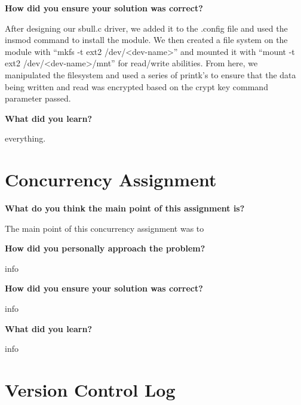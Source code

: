 \documentclass[10pt,letterpaper,draftclsnofoot,onecolumn]{IEEEtran}
\begin{document}
\medskip


\bigskip

\noindent\textbf{How did you ensure your solution was correct?}
\medskip

\medskip

\noindent After designing our sbull.c driver, we added it to the .config file and used the insmod command to install the module. We then created a file system on the module with ``mkfs -t ext2 /dev/\textless dev-name\textgreater'' and mounted it with ``mount -t ext2 /dev/\textless dev-name\textgreater /mnt'' for read/write abilities. From here, we manipulated the filesystem and used a series of printk's to ensure that the data being written and read was encrypted based on the crypt key command parameter passed.

\bigskip

\noindent\textbf{What did you learn?}
\medskip

\medskip

\noindent everything.

\section{Concurrency Assignment}
\bigskip

\noindent\textbf{What do you think the main point of this assignment is?}
\medskip

\medskip

\noindent The main point of this concurrency assignment was to 

\bigskip

\noindent\textbf{How did you personally approach the problem?}
\medskip

\medskip

\noindent info

\bigskip

\noindent\textbf{How did you ensure your solution was correct?}
\medskip

\medskip

\noindent info
\bigskip

\noindent\textbf{What did you learn?}
\medskip

\medskip

\noindent info
\medskip


\section{Version Control Log}
\bigskip
\end{document}
